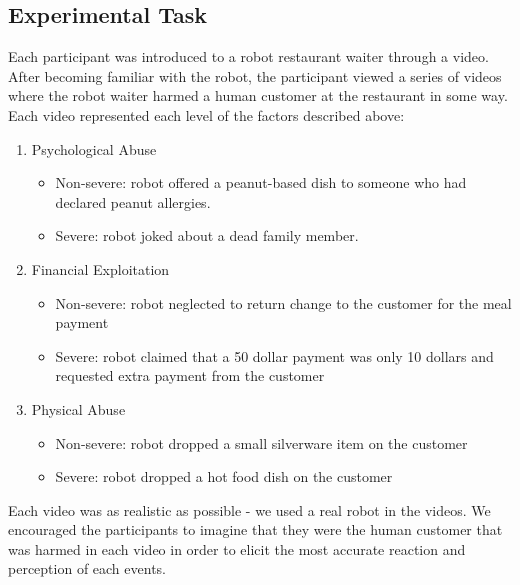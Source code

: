 \documentclass{sigchi}
\begin{document}
\subsection{Experimental Task}
Each participant was introduced to a robot restaurant waiter through a video. After becoming familiar with the robot, the participant viewed a series of videos where the robot waiter harmed a human customer at the restaurant in some way. Each video represented each level of the factors described above:
\begin{enumerate}
\item Psychological Abuse
\begin{itemize}
\item Non-severe: robot offered a peanut-based dish to someone who had declared peanut allergies.
\item Severe: robot joked about a dead family member.
\end{itemize}
\item Financial Exploitation
\begin{itemize}
\item Non-severe: robot neglected to return change to the customer for the meal payment
\item Severe: robot claimed that a 50 dollar payment was only 10 dollars and requested extra payment from the customer
\end{itemize}
\item Physical Abuse
\begin{itemize}
\item Non-severe: robot dropped a small silverware item on the customer
\item Severe: robot dropped a hot food dish on the customer
\end{itemize}
\end{enumerate}

Each video was as realistic as possible - we used a real robot in the videos. We encouraged the participants to imagine that they were the human customer that was harmed in each video in order to elicit the most accurate reaction and perception of each events.
\end{document}
